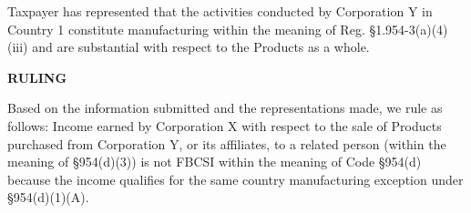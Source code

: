 \begin{select}
 Taxpayer has represented that the activities conducted by Corporation Y in Country 1 constitute manufacturing within the meaning of Reg. \S1.954-3(a)(4)(iii) and are substantial with respect to the Products as a whole.
 
 
\begin{center} \textbf{RULING }
\end{center}

 
 Based on the information submitted and the representations made, we rule as follows:
Income earned by Corporation X with respect to the sale of Products purchased from Corporation Y, or its affiliates, to a related person (within the meaning of \S954(d)(3)) is not FBCSI within the meaning of Code \S954(d) because the income qualifies for the same country manufacturing exception under \S954(d)(1)(A).
 
 \end{select}
	
